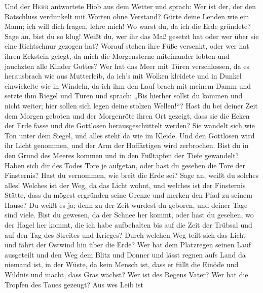  Und der \textsc{Herr} antwortete Hiob aus dem Wetter und
sprach:  Wer ist der, der den Ratschluss verdunkelt mit
Worten ohne Verstand?  Gürte deine Lenden wie ein Mann;
ich will dich fragen, lehre mich!  Wo warst du, da ich die
Erde gründete? Sage an, bist du so klug!  Weißt du, wer
ihr das Maß gesetzt hat oder wer über sie eine Richtschnur gezogen hat?
 Worauf stehen ihre Füße versenkt, oder wer hat ihren
Eckstein gelegt,  da mich die Morgensterne miteinander
lobten und jauchzten alle Kinder Gottes?  Wer hat das Meer
mit Türen verschlossen, da es herausbrach wie aus Mutterleib,
 da ich's mit Wolken kleidete und in Dunkel einwickelte
wie in Windeln,  da ich ihm den Lauf brach mit meinem
Damm und setzte ihm Riegel und Türen  und sprach: „Bis
hierher sollst du kommen und nicht weiter; hier sollen sich legen deine
stolzen Wellen!{}``?  Hast du bei deiner Zeit dem Morgen
geboten und der Morgenröte ihren Ort gezeigt,  dass sie
die Ecken der Erde fasse und die Gottlosen herausgeschüttelt werden?
 Sie wandelt sich wie Ton unter dem Siegel, und alles
steht da wie im Kleide.  Und den Gottlosen wird ihr Licht
genommen, und der Arm der Hoffärtigen wird zerbrochen. 
Bist du in den Grund des Meeres kommen und in den Fußtapfen der Tiefe
gewandelt?  Haben sich dir des Todes Tore je aufgetan,
oder hast du gesehen die Tore der Finsternis?  Hast du
vernommen, wie breit die Erde sei? Sage an, weißt du solches alles!
 Welches ist der Weg, da das Licht wohnt, und welches ist
der Finsternis Stätte,  dass du mögest ergründen seine
Grenze und merken den Pfad zu seinem Hause?  Du weißt es
ja; denn zu der Zeit wurdest du geboren, und deiner Tage sind viele.
 Bist du gewesen, da der Schnee her kommt, oder hast du
gesehen, wo der Hagel her kommt,  die ich habe
aufbehalten bis auf die Zeit der Trübsal und auf den Tag des Streites
und Krieges?  Durch welchen Weg teilt sich das Licht und
fährt der Ostwind hin über die Erde?  Wer hat dem
Platzregen seinen Lauf ausgeteilt und den Weg dem Blitz und Donner
 und lässt regnen aufs Land da niemand ist, in der Wüste,
da kein Mensch ist,  dass er füllt die Einöde und Wildnis
und macht, dass Gras wächst?  Wer ist des Regens Vater?
Wer hat die Tropfen des Taues gezeugt?  Aus wes Leib ist
